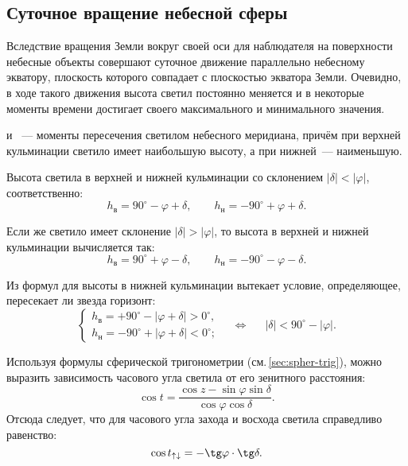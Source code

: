 \subsection{Суточное вращение небесной сферы}
Вследствие вращения Земли вокруг своей оси для наблюдателя на поверхности небесные объекты совершают суточное движение параллельно небесному экватору, плоскость которого совпадает с плоскостью экватора Земли. Очевидно, в ходе такого движения высота светил постоянно меняется и в некоторые моменты времени достигает своего максимального и минимального значения.

 и ~--- моменты пересечения светилом небесного меридиана, причём при верхней кульминации светило имеет наибольшую высоту, а при нижней~--- наименьшую.

Высота светила в верхней и нижней кульминации со склонением $|\delta| < |\varphi|$, соответственно:
\begin{equation}
	h_{\text{в}}= 90^\circ - \varphi + \delta, \quad\quad
	h_{\text{н}}= - 90^\circ + \varphi  + \delta.
\end{equation}

Если же светило имеет склонение $|\delta| > |\varphi|$, то высота в верхней и нижней кульминации вычисляется так:
\begin{equation}
	h_{\text{в}}= 90^\circ + \varphi - \delta, \quad\quad
	h_{\text{н}}= - 90^\circ -\varphi - \delta.
\end{equation}

Из формул для высоты в нижней кульминации вытекает условие, определяющее, пересекает ли звезда горизонт:
\begin{equation}
	\begin{cases}
		h_\text{в}= +90^\circ - |\varphi + \delta| > 0^\circ,\\
		h_\text{н} = - 90^\circ + |\varphi + \delta| < 0^\circ;
	\end{cases}
	\quad \Longleftrightarrow \quad~~ |\delta|< 90^{\circ} - |\varphi|.
\end{equation}

Используя формулы сферической тригонометрии (см.\,\ref{sec:spher-trig}), можно выразить зависимость часового угла светила от его зенитного расстояния:
\begin{equation}
	\cos t=\frac{\cos z-\sin\varphi\sin\delta}{\cos\varphi\cos\delta}.
\end{equation}
Отсюда следует, что для часового угла захода и восхода светила справедливо равенство:
\begin{equation}
	\cos t_{\uparrow\downarrow}=-\tg\varphi\cdot\tg\delta.
\end{equation}

